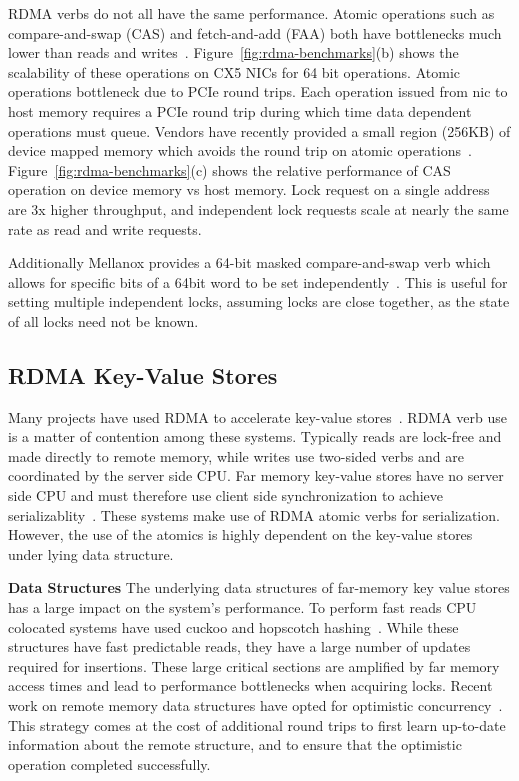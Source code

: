 RDMA verbs do not all have the same performance. Atomic
operations such as compare-and-swap (CAS) and fetch-and-add
(FAA) both have bottlenecks much lower than reads and
writes~\cite{design-guidelines,sherman}.
Figure~\ref{fig:rdma-benchmarks}(b) shows the scalability of
these operations on CX5 NICs for 64 bit operations.
Atomic operations bottleneck due to PCIe round trips. Each
operation issued from nic to host memory requires a PCIe
round trip during which time data dependent operations must
queue. Vendors have recently provided a small region (256KB)
of device mapped memory which avoids the round trip on
atomic operations~\cite{device-memory}.
Figure~\ref{fig:rdma-benchmarks}(c) shows the relative
performance of CAS operation on device memory vs host
memory. Lock request on a single address are 3x higher
throughput, and independent lock requests scale at nearly
the same rate as read and write requests.

Additionally Mellanox provides a 64-bit masked
compare-and-swap verb which allows for specific bits of a
64bit word to be set independently~\cite{rdma-masked-cas}.
This is useful for setting multiple independent locks,
assuming locks are close together, as the state of all locks
need not be known.


\subsection{RDMA Key-Value Stores}

Many projects have used RDMA to accelerate key-value
stores~\cite{farm,erpc,herd,mica,pilaf,cell,faast,storm,memc3}.
RDMA verb use is a matter of contention among these systems.
Typically reads are lock-free and made directly to remote
memory, while writes use two-sided verbs and are coordinated
by the server side CPU.
Far memory key-value stores have no server side CPU and must
therefore use client side synchronization to achieve
serializablity~\cite{rolex,fusee,clover,sherman,ford,race}.
These systems make use of RDMA atomic verbs for
serialization. However, the use of the atomics is highly
dependent on the key-value stores under lying data
structure.

\textbf{Data Structures} The underlying data structures of
far-memory key value stores has a large impact on the
system's performance. To perform fast reads CPU colocated
systems have used cuckoo and hopscotch
hashing~\cite{pilaf,herd,cuckoo,hopscotch}. While these
structures have fast predictable reads, they have a large
number of updates required for insertions. These large
critical sections are amplified by far memory access times
and lead to performance bottlenecks when acquiring locks.
Recent work on remote memory data structures have opted for
optimistic concurrency~\cite{clover,race,ford,rolex,fusee}.
This strategy comes at the cost of additional round trips to
first learn up-to-date information about the remote
structure, and to ensure that the optimistic operation
completed successfully.

